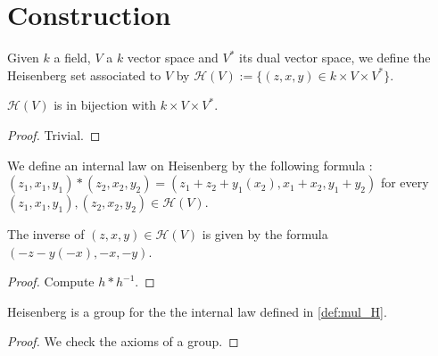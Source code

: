 \section{Construction}

\begin{definition}
    \label{def:heisenberg}
    \leanok

    Given $k$ a field, $V$ a $k$ vector space and $V^*$ its dual vector space,
    we define the Heisenberg set associated to $V$ by
    $\mathcal{H}(V):=\{(z,x,y) \in k\times V\times V^*\}$.
\end{definition}

\begin{proposition}
    \label{prop:bij_H_triv}
    \leanok
    $\mathcal{H}(V)$ is in bijection with $k\times V\times V^*$.
\end{proposition}
\begin{proof}
    \leanok
    Trivial.
\end{proof}

\begin{definition}
    \label{def:mul_H}
    \leanok 

    We define an internal law on Heisenberg by the following formula :
    $(z_1,x_1,y_1)*(z_2,x_2,y_2) = (z_1+z_2+y_1(x_2),x_1+x_2,y_1+y_2)$ for every
     $(z_1,x_1,y_1),(z_2,x_2,y_2)\in\mathcal{H}(V)$.
\end{definition}

\begin{definition}
    \label{def:inv_H}
    \leanok 

    The inverse of $(z,x,y)\in\mathcal{H}(V)$ is given by the formula
    $(-z- y(-x), - x ,- y)$.
    \begin{proof}
        \leanok 
        Compute $h*h^{-1}$.
    \end{proof}
\end{definition}

\begin{proposition}
    \label{prop:group_H}
    \leanok
    Heisenberg is a group for the the internal law defined in \ref{def:mul_H}.
\end{proposition}
\begin{proof}
    \leanok
    We check the axioms of a group.
\end{proof}

